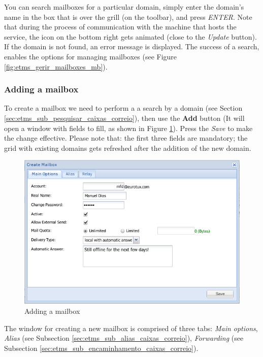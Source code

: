 You can search mailboxes for a particular domain, simply enter the domain's name in the box that is over the grill (on the toolbar), and press \textit{ENTER}. Note that during the process of communication with the machine that hosts the service, the icon on the bottom right gets animated (close to the \textit{Update} button). If the domain is not found, an error message is displayed. The success of a search, enables the options for managing mailboxes (see Figure \ref{fig:etms_gerir_mailboxes_mb}).

\subsubsection{Adding a mailbox}
\label{sec:etms_sub_criar_caixas_correio}
To create a mailbox we need to perform a a search by a domain (see Section \ref{sec:etms_sub_pesquisar_caixas_correio}), then use the \textbf{Add} button (It will open a window with fields to fill, as shown in Figure \ref{fig:etms_criar_mailbox}). Press the \textit{Save} to make the change effective. Please note that: the first three fields are mandatory; the grid with existing domains gets refreshed after the addition of the new domain.

\begin{figure}[H]
    \begin{center}
    \includegraphics[scale=0.45]{screenshots/etms/etms_criar_mailbox.png}
    \caption{Adding a mailbox}
    \label{fig:etms_criar_mailbox}
    \end{center}
\end{figure}

The window for creating a new mailbox is comprised of three tabs: \textit{Main options}, \textit{Alias} (see Subsection \ref{sec:etms_sub_alias_caixas_correio}), \textit{Forwarding} (see Subsection \ref{sec:etms_sub_encaminhamento_caixas_correio}).

